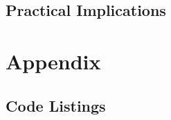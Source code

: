 \documentclass[draft,final]{thesisclass} %
\begin{document}
\section{Practical Implications}
\lipsum[1]

\backmatter


\nocite{*}
\printbibliography

\printindex

\printglossaries


\chapter{Appendix}
\setcounter{page}{1}
\setcounter{chapter}{0}

\section{Code Listings}


\end{document}
